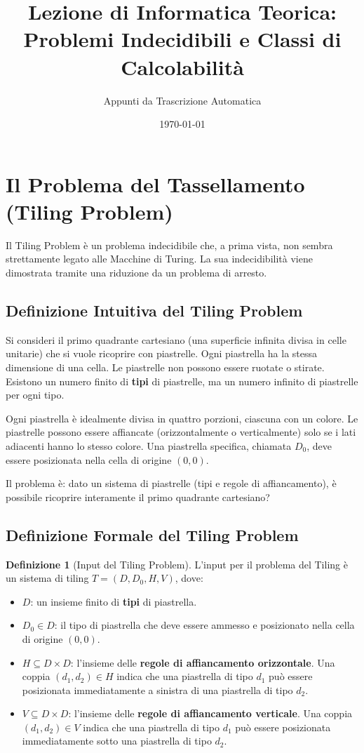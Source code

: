 \documentclass[a4paper]{article}
\title{Lezione di Informatica Teorica: \\ Problemi Indecidibili e Classi di Calcolabilit\`a}
\author{Appunti da Trascrizione Automatica}
\date{\today}
\theoremstyle{definition} %
\newtheorem{definition}{Definizione}
\begin{document}
\maketitle
\tableofcontents
\newpage

\section{Il Problema del Tassellamento (Tiling Problem)}

Il Tiling Problem è un problema indecidibile che, a prima vista, non sembra strettamente legato alle Macchine di Turing. La sua indecidibilità viene dimostrata tramite una riduzione da un problema di arresto.

\subsection{Definizione Intuitiva del Tiling Problem}
Si consideri il primo quadrante cartesiano (una superficie infinita divisa in celle unitarie) che si vuole ricoprire con piastrelle. Ogni piastrella ha la stessa dimensione di una cella.
Le piastrelle non possono essere ruotate o stirate. Esistono un numero finito di \textbf{tipi} di piastrelle, ma un numero infinito di piastrelle per ogni tipo.

Ogni piastrella è idealmente divisa in quattro porzioni, ciascuna con un colore. Le piastrelle possono essere affiancate (orizzontalmente o verticalmente) solo se i lati adiacenti hanno lo stesso colore.
Una piastrella specifica, chiamata $D_0$, deve essere posizionata nella cella di origine $(0,0)$.

Il problema è: dato un sistema di piastrelle (tipi e regole di affiancamento), è possibile ricoprire interamente il primo quadrante cartesiano?

\subsection{Definizione Formale del Tiling Problem}
\begin{definition}[Input del Tiling Problem]
L'input per il problema del Tiling è un sistema di tiling $T = (D, D_0, H, V)$, dove:
\begin{itemize}
    \item $D$: un insieme finito di \textbf{tipi} di piastrella.
    \item $D_0 \in D$: il tipo di piastrella che deve essere ammesso e posizionato nella cella di origine $(0,0)$.
    \item $H \subseteq D \times D$: l'insieme delle \textbf{regole di affiancamento orizzontale}. Una coppia $(d_1, d_2) \in H$ indica che una piastrella di tipo $d_1$ può essere posizionata immediatamente a sinistra di una piastrella di tipo $d_2$.
    \item $V \subseteq D \times D$: l'insieme delle \textbf{regole di affiancamento verticale}. Una coppia $(d_1, d_2) \in V$ indica che una piastrella di tipo $d_1$ può essere posizionata immediatamente sotto una piastrella di tipo $d_2$.
\end{itemize}
\end{definition}
\end{document}

